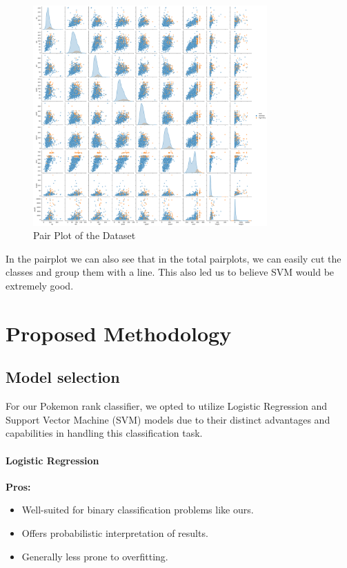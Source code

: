 \documentclass[11pt, letterpaper]{report}
\begin{document}
    \begin{figure}[H]
        \centering
        \includegraphics[width=0.8\textwidth]{pairplot.png} %
        \caption{Pair Plot of the Dataset}
        \label{fig:dataset-pairplot}
    \end{figure}
In the pairplot we can also see that in the total pairplots, we can easily cut the classes and group them with a line. This also led us to believe SVM would be extremely good. 

	\chapter{Proposed Methodology}
\section{Model selection}
For our Pokemon rank classifier, we opted to utilize Logistic Regression and Support Vector Machine (SVM) models due to their distinct advantages and capabilities in handling this classification task.

\subsubsection{Logistic Regression}
\textbf{Pros:}
\begin{itemize}
    \item Well-suited for binary classification problems like ours.
    \item Offers probabilistic interpretation of results.
    \item Generally less prone to overfitting.
\end{itemize}
\end{document}
